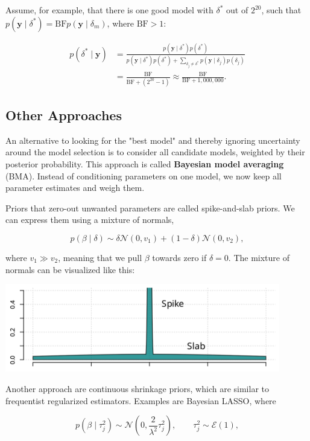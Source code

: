 Assume, for example, that there is one good model with $\delta^*$ out of $2^{20}$, such that $p(\bm{y}\mid\delta^*) = \mathrm{BF} p(\bm{y}\mid \delta_m)$, where $\mathrm{BF}>1$:

\begin{align*}
	p(\delta^*\mid\bm{y}) &= \frac{p(\bm{y}\mid \delta^*)p(\delta^*)}{p(\bm{y}\mid \delta^*)p(\delta^*) + \sum_{\delta_j\neq\delta^*}p(\bm{y}\mid\delta_j)p(\delta_j)} \\
	&= \frac{\mathrm{BF}}{\mathrm{BF} + (2^{20}-1)} \approx \frac{\mathrm{BF}}{\mathrm{BF} + 1{,}000{,}000}.
\end{align*}

\subsection{Other Approaches}

An alternative to looking for the "best model" and thereby ignoring uncertainty around the model selection is to consider all candidate models, weighted by their posterior probability. This approach is called \textbf{Bayesian model averaging} (BMA). Instead of conditioning parameters on one model, we now keep all parameter estimates and weigh them. 

Priors that zero-out unwanted parameters are called spike-and-slab priors. We can express them using a mixture of normals,

\[
	p(\beta\mid\delta)\sim \delta\mathcal{N}(0,v_1) + (1-\delta)\mathcal{N}(0,v_2),
\]

where $v_1\gg v_2$, meaning that we pull $\beta$ towards zero if $\delta= 0$. The mixture of normals can be visualized like this:

\begin{center}
	\includegraphics[width = 12cm]{spikeslab.png}
\end{center}

Another approach are continuous shrinkage priors, which are similar to frequentist regularized estimators. Examples are Bayesian LASSO, where

\[
	p(\beta\mid\tau_j^2)\sim\mathcal{N}\left(0,\frac{2}{\lambda^2}\tau^2_j\right), \qquad \tau_j^2\sim\mathcal{E}(1),
\]

